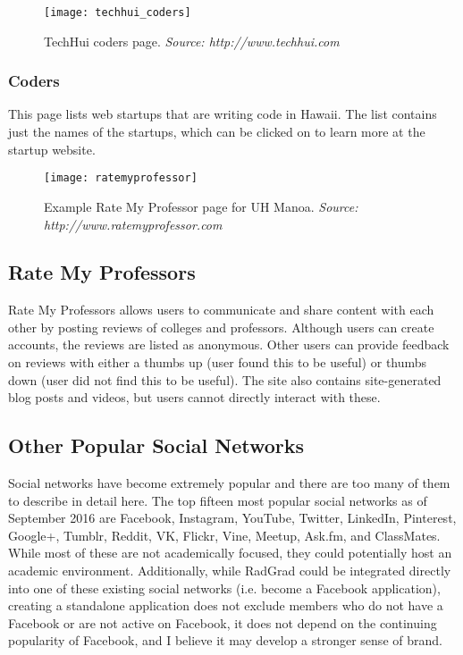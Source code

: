 \begin{figure}[h]
\centering
\texttt{[image: techhui\_coders]}
\caption{TechHui coders page. \textit{Source: http://www.techhui.com}}
\end{figure}
\subsubsection{Coders}
This page lists web startups that are writing code in Hawaii. The list contains just the names of the startups, which can be clicked on to learn more at the startup website.

\begin{figure}[h]
\centering
\texttt{[image: ratemyprofessor]}
\caption{Example Rate My Professor page for UH Manoa. \textit{Source: http://www.ratemyprofessor.com}}
\end{figure}
\subsection{Rate My Professors}
Rate My Professors allows users to communicate and share content with each other by posting reviews of colleges and professors. Although users can create accounts, the reviews are listed as anonymous. Other users can provide feedback on reviews with either a thumbs up (user found this to be useful) or thumbs down (user did not find this to be useful). The site also contains site-generated blog posts and videos, but users cannot directly interact with these.

\subsection{Other Popular Social Networks}
Social networks have become extremely popular and there are too many of them to describe in detail here. The top fifteen most popular social networks as of September 2016 are Facebook, Instagram, YouTube, Twitter, LinkedIn, Pinterest, Google+, Tumblr, Reddit, VK, Flickr, Vine, Meetup, Ask.fm, and ClassMates. While most of these are not academically focused, they could potentially host an academic environment. Additionally, while RadGrad could be integrated directly into one of these existing social networks (i.e. become a Facebook application), creating a standalone application does not exclude members who do not have a Facebook or are not active on Facebook, it does not depend on the continuing popularity of Facebook, and I believe it may develop a stronger sense of brand. 

